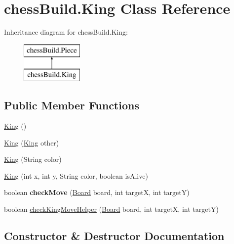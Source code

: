 \hypertarget{classchess_build_1_1_king}{}\section{chess\+Build.\+King Class Reference}
\label{classchess_build_1_1_king}
Inheritance diagram for chess\+Build.\+King\+:\begin{figure}[H]
\begin{center}
\leavevmode
\includegraphics[height=2.000000cm]{classchess_build_1_1_king}
\end{center}
\end{figure}
\subsection*{Public Member Functions}
\begin{DoxyCompactItemize}
\item 
\hyperlink{classchess_build_1_1_king_a9d47020d3baaa12653e51f3eec27e9b1}{King} ()
\item 
\hyperlink{classchess_build_1_1_king_ad07e90a3afe7fed1830d734dbd4817a8}{King} (\hyperlink{classchess_build_1_1_king}{King} other)
\item 
\hyperlink{classchess_build_1_1_king_a24d4ed37d11c00c7475ed7fe529ece66}{King} (String color)
\item 
\hyperlink{classchess_build_1_1_king_a3f2ec37749356fa6f5faaabaa0bb2d07}{King} (int x, int y, String color, boolean is\+Alive)
\item 
\mbox{\label{classchess_build_1_1_king_a41d9aba602d97e747e20fae592a4378c}} 
boolean {\bfseries check\+Move} (\hyperlink{classchess_build_1_1_board}{Board} board, int targetX, int targetY)
\item 
boolean \hyperlink{classchess_build_1_1_king_aceffd2bb1fe5398fac99961e70420e39}{check\+King\+Move\+Helper} (\hyperlink{classchess_build_1_1_board}{Board} board, int targetX, int targetY)
\end{DoxyCompactItemize}


\subsection{Constructor \& Destructor Documentation}
\mbox{\label{classchess_build_1_1_king_a9d47020d3baaa12653e51f3eec27e9b1}} 
